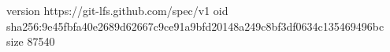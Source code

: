 version https://git-lfs.github.com/spec/v1
oid sha256:9e45fbfa40e2689d62667c9ce91a9bfd20148a249c8bf3df0634c135469496bc
size 87540
